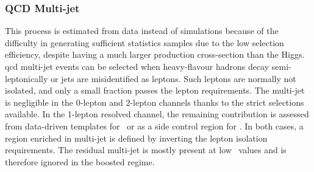 \subsubsection{QCD Multi-jet}
This process is estimated from data instead of simulations because of the difficulty in generating sufficient statistics samples due to the low selection efficiency, despite having a much larger production cross-section than the Higgs. \gls{qcd} multi-jet events can be selected when heavy-flavour hadrons decay semi-leptonically or jets are misidentified as leptons. Such leptons are normally not isolated, and only a small fraction passes the lepton requirements. The multi-jet is negligible in the 0-lepton and 2-lepton channels thanks to the strict selections available. In the 1-lepton resolved channel, the remaining contribution is assessed from data-driven templates for \vhb\ or as a side control region for \vhc. In both cases, a region enriched in multi-jet is defined by inverting the lepton isolation requirements. The residual multi-jet is mostly present at low \ptv\ values and is therefore ignored in the boosted regime.

